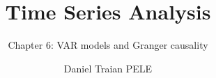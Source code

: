 \title[Time Series Analysis]{Time Series Analysis}
\subtitle{Chapter 6: VAR models and Granger causality}
\author[D.T. Pele]{Daniel Traian PELE}
\date{}

\providecommand{\tsaapplink}[3]{\hypertarget{#2}{}\hyperlink{#1}{\beamergotobutton{#3}}}  %
\providecommand{\tsaappback}[2]{\begin{tikzpicture}[remember picture,overlay]\node[anchor=south east] at ([xshift=-3mm,yshift=7mm]current page.south east){\hyperlink{#1}{\beamerreturnbutton{#2}}};\end{tikzpicture}}  %
\providecommand{\tsachlink}[2]{\href{#1}{#2}}  %
\providecommand{\tsachlinkt}[2]{\href{#1}{\usebeamercolor[fg]{frametitle}#2}}  %


